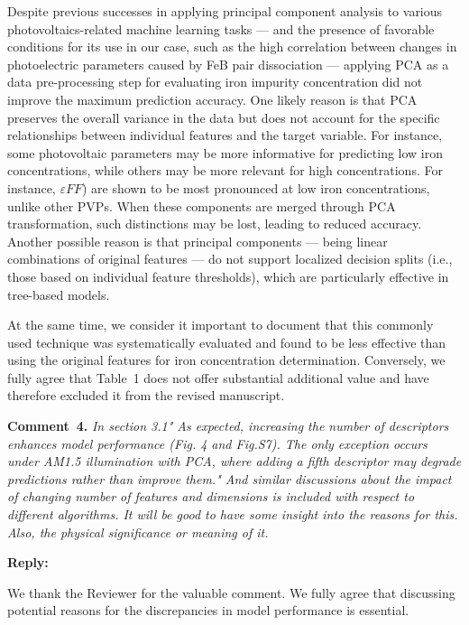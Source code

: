 \documentclass[a4paper,fleqn]{cas-sc}
\begin{document}
Despite previous successes in applying principal component analysis to various photovoltaics-related machine learning tasks ---
and the presence of favorable conditions for its use in our case,
such as the high correlation between changes in photoelectric parameters caused by FeB pair dissociation ---
applying PCA as a data pre-processing step for evaluating iron impurity concentration did not improve the maximum prediction accuracy.
One likely reason is that PCA preserves the overall variance in the data
but does not account for the specific relationships between individual features and the target variable.
For instance, some photovoltaic parameters may be more informative for predicting low iron concentrations,
while others may be more relevant for high concentrations.
For instance, $\varepsilon F\!F$) are shown \cite{Olikh2025MSEB} to be most pronounced at low iron concentrations, unlike other PVPs.
When these components are merged through PCA transformation, such distinctions may be lost, leading to reduced accuracy.
Another possible reason is that principal components ---
being linear combinations of original features --- do not support localized decision splits
(i.e., those based on individual feature thresholds), which are particularly effective in tree-based models.

At the same time, we consider it important to document that this commonly used technique was systematically evaluated
and found to be less effective than using the original features for iron concentration determination.
Conversely, we fully agree that Table~1 does not offer substantial additional value and have therefore excluded it from the revised manuscript.




\vspace{1cm}
\noindent
\textcolor[rgb]{0.00,0.50,1.00}{\textbf{Comment~4.}}
\emph{In section 3.1" As expected, increasing the number of descriptors enhances model performance (Fig. 4 and Fig.S7).
The only exception occurs under AM1.5 illumination with PCA, where adding a fifth descriptor may degrade predictions rather than improve them."
And similar discussions about the impact of changing number of features and dimensions is included with respect to different algorithms.
It will be good to have some insight into the reasons for this. Also, the physical significance or meaning of it.}

\noindent
\textcolor[rgb]{0.51,0.00,0.00}{\textbf{Reply:}}

We thank the Reviewer for the valuable comment.
We fully agree that discussing potential reasons for the discrepancies in model performance is essential.
\end{document}
